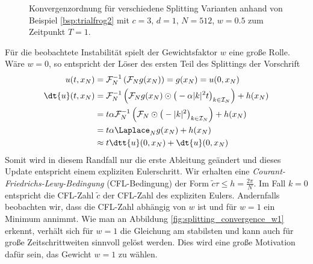 \begin{mathbsp}
\begin{figure}[!htb]
\caption{Konvergenzordnung für verschiedene Splitting Varianten anhand von Beispiel \ref{bsp:trialfrog2} mit $c=3$, $d=1$, $N=512$, $w=0.5$ zum Zeitpunkt $T=1$.}
\label{fig:splitting_convergence}
\end{figure}
Für die beobachtete Instabilität spielt der Gewichtsfaktor $w$ eine große Rolle. Wäre $w=0$, so entspricht der Löser des ersten Teil des Splittings der Vorschrift
\begin{align*}
u(t,x_N)&=\mathcal{F}_N^{-1}\left(\mathcal{F}_Ng(x_N)\right)=g(x_N)=u(0,x_N)\\
\dt{u}(t,x_N)&=\mathcal{F}_N^{-1}\left(\mathcal{F}_Ng(x_N)\odot \big(-\alpha |k|^2t\big)_{k\in\mathcal{I}_N}\right)+h(x_N)\\
&=t \alpha \mathcal{F}_N^{-1}\left(\mathcal{F}_N\odot \big(-|k|^2\big)_{k\in\mathcal{I}_N}\right)+h(x_N)\\
&=t\alpha \Laplace_N g(x_N)+h(x_N)\\
&\approx t\dtt{u}(0,x_N)+\dt{u}(0,x_N)
\end{align*}
Somit wird in diesem Randfall nur die erste Ableitung geändert und dieses Update entspricht einem expliziten Eulerschritt. Wir erhalten eine \emph{Courant-Friedrichs-Lewy-Bedingung} (CFL-Bedingung) der Form $\tilde{c}\tau\le h=\frac{2\pi}{N}$. Im Fall $k=0$ entspricht die CFL-Zahl $\tilde{c}$ der CFL-Zahl des expliziten Eulers. Andernfalls beobachten wir, dass die CFL-Zahl abhängig von $w$ ist und für $w=1$ ein Minimum annimmt. Wie man an Abbildung \ref{fig:splitting_convergence_w1} erkennt, verhält sich für $w=1$ die Gleichung am stabilsten und kann auch für große Zeitschrittweiten sinnvoll gelöst werden. Dies wird eine große Motivation dafür sein, das Gewicht $w=1$ zu wählen.


\end{mathbsp}
